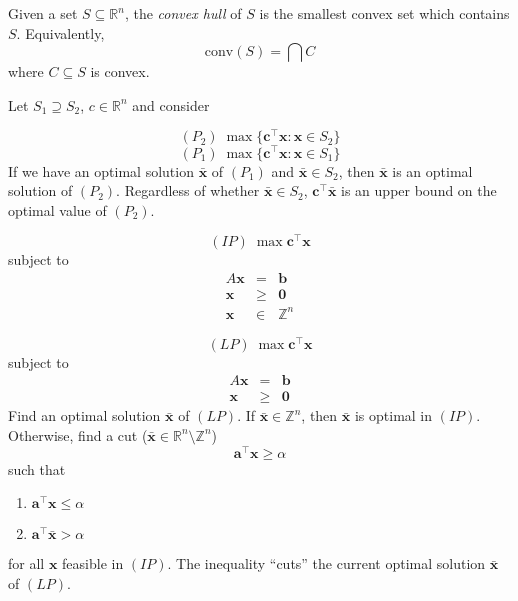 \begin{defbox}
    \begin{definition}
        Given a set $ S\subseteq \mathbb{R}^n $, the \emph{convex hull} of $ S $
        is the smallest convex set which contains $ S $.
        Equivalently,
        \[ \text{conv}(S)=\bigcap C \]
        where $ C\subseteq S $ is convex.
    \end{definition}
\end{defbox}

Let $ S_1\supseteq S_2 $, $ c\in\mathbb{R}^n $ and consider

\[ (P_2)\; \max \{\bm{c}^\top\bm{x}:\bm{x}\in S_2\} \]
\[ (P_1)\; \max \{\bm{c}^\top\bm{x}:\bm{x}\in S_1\} \]
If we have an optimal solution $ \bm{\bar{x}} $ of $ (P_1) $ and $ \bm{\bar{x}}\in S_2 $,
then $ \bm{\bar{x}} $ is an optimal solution of $ (P_2) $. Regardless of whether
$ \bm{\bar{x}}\in S_2 $, $ \bm{c}^\top \bm{\bar{x}} $ is an upper bound on the optimal
value of $ (P_2) $.

\[ (IP)\; \max \bm{c}^\top \bm{x} \]
subject to
\[
    \begin{array}{ccc}
        A\bm{x} & =         & \bm{b}       \\
        \bm{x}  & \geqslant & \bm{0}       \\
        \bm{x}  & \in       & \mathbb{Z}^n
    \end{array} \]

\[ (LP)\; \max \bm{c}^\top \bm{x} \]
subject to
\[
    \begin{array}{ccc}
        A\bm{x} & =         & \bm{b} \\
        \bm{x}  & \geqslant & \bm{0}
    \end{array} \]
Find an optimal solution $ \bm{\bar{x}} $ of $ (LP) $. If $ \bm{\bar{x}}\in\mathbb{Z}^n $,
then $ \bm{\bar{x}} $ is optimal in $ (IP) $. Otherwise,
find a cut ($ \bm{\bar{x}}\in\mathbb{R}^n\setminus \mathbb{Z}^n $)
\[ \bm{a}^\top \bm{x} \geqslant \alpha \]
such that
\begin{enumerate}[label=(\roman*)]
    \item $ \bm{a}^\top\bm{x}\leqslant \alpha $
    \item $ \bm{a}^\top \bm{\bar{x}}>\alpha $
\end{enumerate}
for all $ \bm{x} $ feasible in $ (IP) $. The inequality ``cuts''
the current optimal solution $ \bm{\bar{x}} $ of $ (LP) $.


